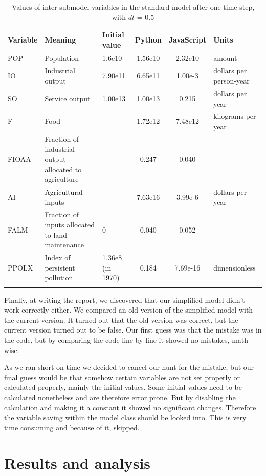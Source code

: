 \documentclass[10pt,a4paper]{scrartcl}
\begin{document}
\begin{longtable}{|m{1.3cm}|m{3cm}|m{1.2cm}|c|c|m{2cm}|}
\hline
\textbf{Variable} & \textbf{Meaning} & \textbf{Initial value} & \textbf{Python} & \textbf{JavaScript} & \textbf{Units}\\
\hline
POP & Population & 1.6e10 & 1.56e10 & 2.32e10 & amount\\
\hline
IO & Industrial output & 7.90e11 & 6.65e11 & 1.00e-3 & dollars per person-year\\
\hline
SO & Service output & 1.00e13 & 1.00e13 & 0.215 & dollars per year\\
\hline
F & Food & - & 1.72e12 & 7.48e12 & kilograms per year\\
\hline
FIOAA & Fraction of industrial output allocated to agriculture & - & 0.247 & 0.040 & -\\
\hline
AI & Agricultural inputs & - & 7.63e16 & 3.99e-6 & dollars per year\\
\hline
FALM & Fraction of inputs allocated to land maintenance & 0 & 0.040 & 0.052 & -\\
\hline
PPOLX & Index of persistent pollution & 1.36e8 (in 1970) & 0.184 & 7.69e-16 & dimensionless\\
\hline
\caption{Values of inter-submodel variables in the standard model after one time step, with $dt$ = 0.5}
\label{value-differences}
\end{longtable}

Finally, at writing the report, we discovered that our simplified model didn't work correctly either. We compared an old version of the simplified model with the current version. It turned out that the old version was correct, but the current version turned out to be false. Our first guess was that the mistake was in the code, but by comparing the code line by line it showed no mistakes, math wise.

As we ran short on time we decided to cancel our hunt for the mistake, but our final guess would be that somehow certain variables are not set properly or calculated properly, mainly the initial values. Some initial values need to be calculated nonetheless and are therefore error prone. But by disabling the calculation and making it a constant it showed no significant changes. Therefore the variable saving within the model class should be looked into. This is very time consuming and because of it, skipped.

\section*{Results and analysis}
\end{document}
